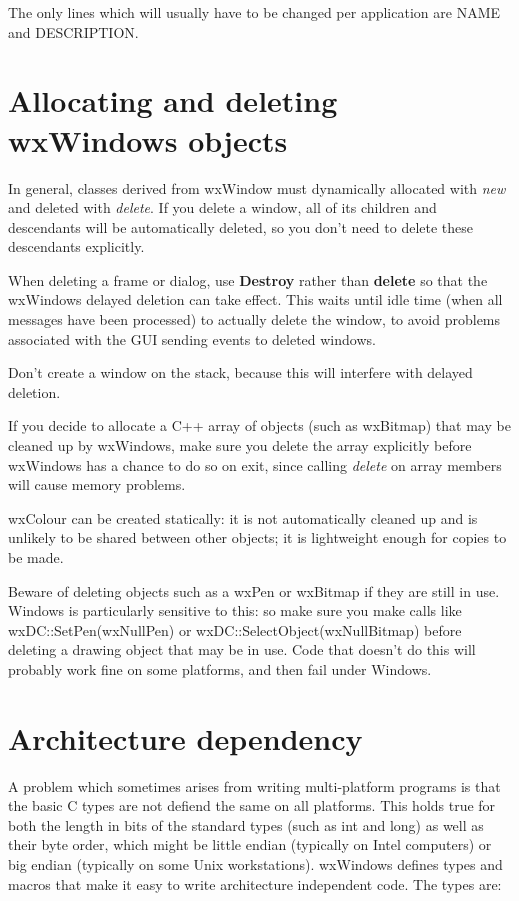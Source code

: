 The only lines which will usually have to be changed per application are
NAME and DESCRIPTION.

\section{Allocating and deleting wxWindows objects}

In general, classes derived from wxWindow must dynamically allocated
with {\it new} and deleted with {\it delete}. If you delete a window,
all of its children and descendants will be automatically deleted,
so you don't need to delete these descendants explicitly.

When deleting a frame or dialog, use {\bf Destroy} rather than {\bf delete} so
that the wxWindows delayed deletion can take effect. This waits until idle time
(when all messages have been processed) to actually delete the window, to avoid
problems associated with the GUI sending events to deleted windows.

Don't create a window on the stack, because this will interfere
with delayed deletion.

If you decide to allocate a C++ array of objects (such as wxBitmap) that may
be cleaned up by wxWindows, make sure you delete the array explicitly
before wxWindows has a chance to do so on exit, since calling {\it delete} on
array members will cause memory problems.

wxColour can be created statically: it is not automatically cleaned
up and is unlikely to be shared between other objects; it is lightweight
enough for copies to be made.

Beware of deleting objects such as a wxPen or wxBitmap if they are still in use.
Windows is particularly sensitive to this: so make sure you
make calls like wxDC::SetPen(wxNullPen) or wxDC::SelectObject(wxNullBitmap) before deleting
a drawing object that may be in use. Code that doesn't do this will probably work
fine on some platforms, and then fail under Windows.

\section{Architecture dependency}

A problem which sometimes arises from writing multi-platform programs is that
the basic C types are not defiend the same on all platforms. This holds true
for both the length in bits of the standard types (such as int and long) as 
well as their byte order, which might be little endian (typically
on Intel computers) or big endian (typically on some Unix workstations). wxWindows
defines types and macros that make it easy to write architecture independent
code. The types are:

